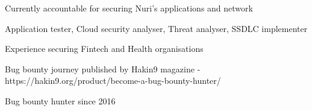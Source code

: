 
\cvsubsection{}

  \begin{cvitems} %
    \item {Currently accountable for securing Nuri's applications and network}
    \item {Application tester, Cloud security analyser, Threat analyser, SSDLC implementer}
    \item {Experience securing Fintech and Health organisations}
    \item {Bug bounty journey published by Hakin9 magazine - https://hakin9.org/product/become-a-bug-bounty-hunter/}
    \item {Bug bounty hunter since 2016}

  \end{cvitems}
